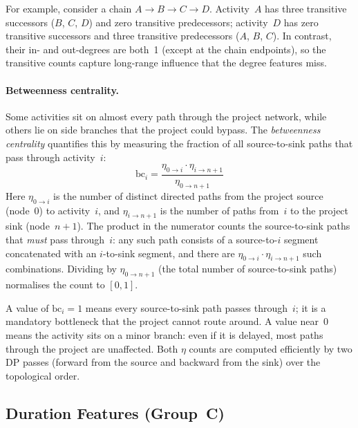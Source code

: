 For example, consider a chain $A \to B \to C \to D$. Activity~$A$
has three transitive successors ($B$, $C$, $D$) and zero
transitive predecessors; activity~$D$ has zero transitive
successors and three transitive predecessors ($A$, $B$, $C$).
In contrast, their in- and out-degrees are both~1 (except at
the chain endpoints), so the transitive counts capture
long-range influence that the degree features miss.

\paragraph{Betweenness centrality.}
Some activities sit on almost every path through the project
network, while others lie on side branches that the project
could bypass. The \textit{betweenness centrality} quantifies
this by measuring the fraction of all source-to-sink paths
that pass through activity~$i$:
\begin{equation}
    \mathrm{bc}_i = \frac{\eta_{0 \to i} \cdot
    \eta_{i \to n{+}1}}{\eta_{0 \to n{+}1}}
    \label{eq:betweenness}
\end{equation}
Here $\eta_{0 \to i}$ is the number of distinct directed
paths from the project source (node~0) to activity~$i$, and
$\eta_{i \to n{+}1}$ is the number of paths from~$i$ to the
project sink (node~$n{+}1$). The product in the numerator
counts the source-to-sink paths that \emph{must} pass
through~$i$: any such path consists of a source-to-$i$
segment concatenated with an $i$-to-sink segment, and there
are $\eta_{0 \to i} \cdot \eta_{i \to n{+}1}$ such
combinations. Dividing by $\eta_{0 \to n{+}1}$ (the total
number of source-to-sink paths) normalises the count to
$[0, 1]$.

A value of $\mathrm{bc}_i = 1$ means every source-to-sink path
passes through~$i$; it is a mandatory bottleneck that the
project cannot route around. A value near~$0$ means the activity
sits on a minor branch: even if it is delayed, most paths
through the project are unaffected. Both $\eta$ counts are
computed efficiently by two DP passes (forward from the source
and backward from the sink) over the topological order.

\subsection{Duration Features (Group~C)}
\label{subsec:duration_features}

